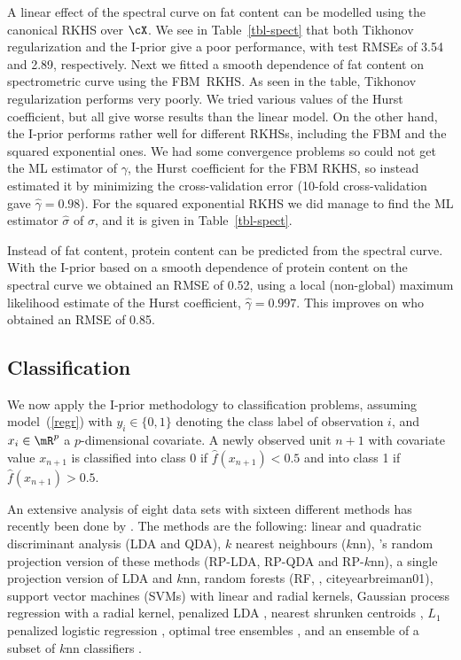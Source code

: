 \documentclass[preprint,12pt,authoryear]{elsarticle}
\newcommand{\fbm}{{FBM}}
\begin{document}
A linear effect of the spectral curve on fat content can be modelled using the canonical RKHS over $\cX$. We see in Table~\ref{tbl-spect} that both Tikhonov regularization and the I-prior give a poor performance, with test RMSEs of 3.54 and 2.89, respectively. Next we fitted a smooth dependence of fat content on spectrometric curve using the \fbm\ RKHS. As seen in the table, Tikhonov regularization performs very poorly. We tried various values of the Hurst coefficient, but all give worse results than the linear model.
On the other hand, the I-prior performs rather well for different RKHSs, including the FBM and the squared exponential ones. We had some convergence problems so could not get the ML estimator of $\gamma$, the Hurst coefficient for the FBM RKHS, so instead estimated it by minimizing the cross-validation error (10-fold cross-validation gave $\hat\gamma=0.98$). For the squared exponential RKHS we did manage to find the ML estimator $\hat\sigma$ of $\sigma$, and it is given in Table~\ref{tbl-spect}.

Instead of fat content, protein content can be predicted from the spectral curve.
With the I-prior based on a smooth dependence of protein content on the spectral curve we obtained an RMSE of 0.52, using a local (non-global) maximum likelihood estimate of the Hurst coefficient, $\hat\gamma=0.997$. This improves on \citet{zyh14} who obtained an RMSE of 0.85.



\subsection{Classification}

We now apply the I-prior methodology to classification problems, assuming model~(\ref{regr}) with $y_i\in\{0,1\}$ denoting the class label of observation $i$, and $x_i\in\mR^p$ a $p$-dimensional covariate. A newly observed unit $n+1$ with covariate value $x_{n+1}$ is classified into class $0$ if $\hat f(x_{n+1})<0.5$ and into class 1 if $\hat f(x_{n+1})>0.5$.

An extensive analysis of eight data sets with sixteen different methods has recently been done by \citet{cs17}. The methods are the following: linear and quadratic discriminant analysis (LDA and QDA), $k$ nearest neighbours ($k$nn), \citeauthor{cs17}'s random projection version of these methods (RP-LDA, RP-QDA and RP-$k$nn), a single projection version of LDA and $k$nn, random forests (RF, \citeauthor{breiman01}, citeyear{breiman01}), support vector machines (SVMs) with linear and radial kernels, Gaussian process regression with a radial kernel, penalized LDA \citep{wt11}, nearest shrunken centroids \citep{thnc03}, $L_1$ penalized logistic regression \citep{gmc15}, optimal tree ensembles \citep{khan16}, and an ensemble of a subset of $k$nn classifiers \citep{gul16}.
\end{document}
